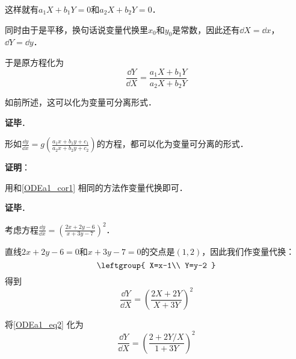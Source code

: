 这样就有$a_1X+b_1Y=0$和$a_2X+b_2Y=0$．

同时由于是平移，换句话说变量代换里$x_0$和$y_0$是常数，因此还有$\dd X=\dd x$，$\dd Y=\dd y$．

于是原方程化为
\begin{equation}
\frac{\dd Y}{\dd X}=\frac{a_1X+b_1Y}{a_2X+b_2Y}
\end{equation}

如前所述，这可以化为变量可分离形式．

\textbf{证毕}．

\begin{corollary}{}
形如$\frac{\dd y}{\dd x}=g(\frac{a_1x+b_1y+c_1}{a_2x+b_2y+c_2})$的方程，都可以化为变量可分离的形式．
\end{corollary}

\textbf{证明}：

用和\autoref{ODEa1_cor1} 相同的方法作变量代换即可．

\textbf{证毕}．

\begin{example}{}
考虑方程$\frac{\dd y}{\dd x}=(\frac{2x+2y-6}{x+3y-7})^2$．

直线$2x+2y-6=0$和$x+3y-7=0$的交点是$(1, 2)$，因此我们作变量代换：
\begin{equation}
\leftgroup{
    X=x-1\\
    Y=y-2
}
\end{equation}
得到
\begin{equation}\label{ODEa1_eq2}
\frac{\dd Y}{\dd X}=(\frac{2X+2Y}{X+3Y})^2
\end{equation}

将\autoref{ODEa1_eq2} 化为
\begin{equation}
\frac{\dd Y}{\dd X}=(\frac{2+2Y/X}{1+3Y})^2
\end{equation}

\end{example}









